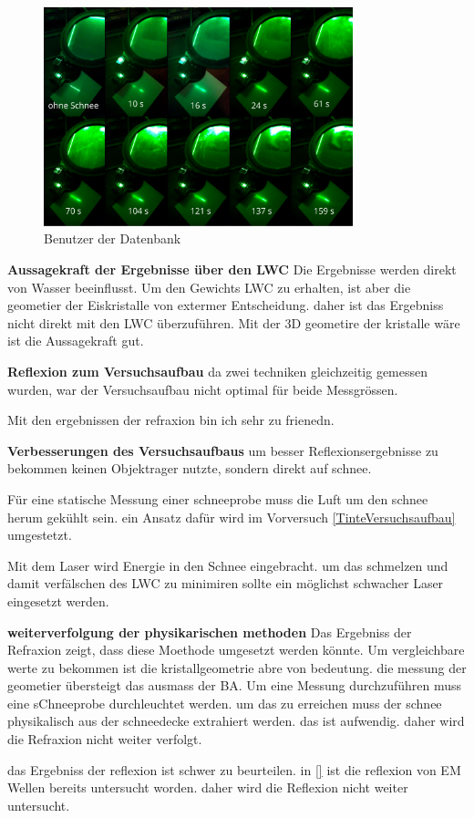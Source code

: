 \begin{figure}
    \centering
    \includegraphics[width=0.8\textwidth]{Bilder/Screenshotfrom2024-04-0413-27-28.png}
    \caption{Benutzer der Datenbank}
    \label{fig:LaserRef}
\end{figure}


\textbf{Aussagekraft der Ergebnisse über den LWC} Die Ergebnisse werden direkt von Wasser beeinflusst. Um den Gewichts LWC zu erhalten, ist aber die geometier der Eiskristalle von extermer Entscheidung. daher ist das Ergebniss nicht direkt mit den LWC überzuführen. Mit der 3D geometire der kristalle wäre ist die Aussagekraft gut.

\textbf{Reflexion zum Versuchsaufbau}
da zwei techniken gleichzeitig gemessen wurden, war der Versuchsaufbau nicht optimal für beide Messgrössen.

Mit den ergebnissen der refraxion bin ich sehr zu frienedn.

\textbf{Verbesserungen des Versuchsaufbaus}
um besser Reflexionsergebnisse zu bekommen keinen Objektrager nutzte, sondern direkt auf schnee.

Für eine statische Messung einer schneeprobe muss die Luft um den schnee herum gekühlt sein. ein Ansatz dafür wird im Vorversuch \ref{TinteVersuchsaufbau} umgestetzt.

Mit dem Laser wird Energie in den Schnee eingebracht. um das schmelzen und damit verfälschen des LWC zu minimiren sollte ein möglichst schwacher Laser eingesetzt werden.

\textbf{weiterverfolgung der physikarischen methoden}
Das Ergebniss der Refraxion zeigt, dass diese Moethode umgesetzt werden könnte. Um vergleichbare werte zu bekommen ist die kristallgeometrie abre von bedeutung. die messung der geometier übersteigt das ausmass der BA. Um eine Messung durchzuführen muss eine sChneeprobe durchleuchtet werden. um das zu erreichen muss der schnee physikalisch aus der schneedecke extrahiert werden. das ist aufwendig. daher wird die Refraxion nicht weiter verfolgt.

das Ergebniss der reflexion ist schwer zu beurteilen. in \ref{} ist die reflexion von EM Wellen bereits untersucht worden. daher wird die Reflexion nicht weiter untersucht.


